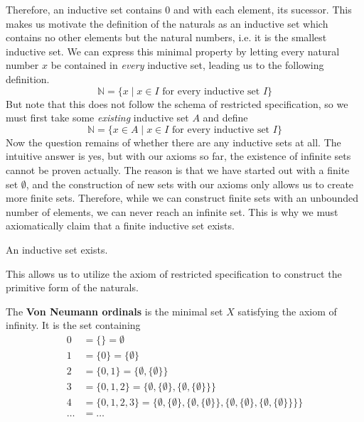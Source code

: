   Therefore, an inductive set contains $0$ and with each element, its sucessor. This makes us motivate the definition of the naturals as an inductive set which contains no other elements but the natural numbers, i.e. it is the smallest inductive set. We can express this minimal property by letting every natural number $x$ be contained in \textit{every} inductive set, leading us to the following definition. 
  \begin{equation}
    \mathbb{N} = \{x \mid x \in I \text{ for every inductive set } I \} 
  \end{equation}
  But note that this does not follow the schema of restricted specification, so we must first take some \textit{existing} inductive set $A$ and define 
  \begin{equation}
    \mathbb{N} = \{x \in A \mid x \in I \text{ for every inductive set } I \} 
  \end{equation} 
  Now the question remains of whether there are any inductive sets at all. The intuitive answer is yes, but with our axioms so far, the existence of infinite sets cannot be proven actually. The reason is that we have started out with a finite set $\emptyset$, and the construction of new sets with our axioms only allows us to create more finite sets. Therefore, while we can construct finite sets with an unbounded number of elements, we can never reach an infinite set. This is why we must axiomatically claim that a finite inductive set exists. 

  \begin{axiom}
    An inductive set exists. 
  \end{axiom}

  This allows us to utilize the axiom of restricted specification to construct the primitive form of the naturals. 

  \begin{definition} 
     The \textbf{Von Neumann ordinals} is the minimal set $X$ satisfying the axiom of infinity. It is the set containing 
    \begin{align*}
      0 & = \{\} = \emptyset \\
      1 & = \{0\} = \{\emptyset\} \\
      2 & = \{0,1\} = \{\emptyset,\{\emptyset\}\} \\
      3 & = \{0,1,2\} = \{\emptyset,\{\emptyset\},\{\emptyset,\{\emptyset\}\}\} \\
      4 & = \{0,1,2,3\} = \{\emptyset,\{\emptyset\},\{\emptyset,\{\emptyset\}\},\{\emptyset,\{\emptyset\},\{\emptyset,\{\emptyset\}\}\}\} \\
      \ldots & = \ldots 
    \end{align*} 
  \end{definition} 

